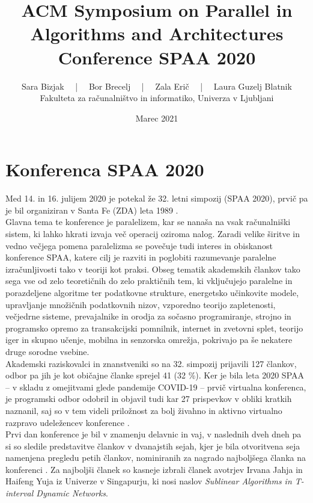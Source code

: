 \documentclass[a4paper,11pt]{article}
\title{
\textbf{ACM Symposium on Parallel in Algorithms and Architectures} 
\\
Conference SPAA 2020
}
\author{Sara Bizjak  \ \ |  \ \ Bor Brecelj  \ \ |  \ \  Zala Erič  \ \ |  \ \  Laura Guzelj Blatnik
\\
\small{Fakulteta za računalništvo in informatiko, Univerza v Ljubljani}}
\date{Marec 2021}
\begin{document}
\maketitle


\section{Konferenca SPAA 2020}

Med 14. in 16. julijem 2020 je potekal že 32. letni simpozij (SPAA 2020), prvič pa je bil organiziran v Santa Fe (ZDA) leta 1989 \cite{bib:opis}.
\\
Glavna tema te konference je paralelizem, kar se nanaša na vsak računalniški sistem, ki lahko hkrati izvaja več operacij oziroma nalog.
Zaradi velike širitve in vedno večjega pomena paralelizma se povečuje tudi interes in obiskanost konference SPAA, katere
cilj je razviti in poglobiti razumevanje paralelne izračunljivosti tako v teoriji kot praksi. 
Obseg tematik akademskih člankov tako sega vse od zelo teoretičnih do zelo praktičnih tem, 
ki vključujejo paralelne in porazdeljene algoritme ter podatkovne strukture, energetsko učinkovite modele, upravljanje množičnih podatkovnih nizov, vzporedno teorijo zapletenosti, 
večjedrne sisteme, prevajalnike in orodja za sočasno programiranje, strojno in programsko opremo za transakcijski pomnilnik, internet in zvetovni splet, teorijo iger in skupno učenje, mobilna in senzorska omrežja, pokrivajo pa še nekatere druge sorodne vsebine.
\\
Akademski raziskovalci in znanstveniki so na 32. simpozij prijavili 127 člankov, odbor pa jih je kot običajne članke sprejel 41 (32 \%).
Ker je bila leta 2020 SPAA -- v skladu z omejitvami glede pandemije COVID-19 -- prvič virtualna konferenca, je programski odbor odobril in objavil tudi kar 27 prispevkov v obliki kratkih naznanil,
saj so v tem videli priložnost za bolj živahno in aktivno virtualno razpravo udeležencev konference \cite{bib:opis}.
\\
Prvi dan konference je bil v znamenju delavnic in vaj, v naslednih dveh dneh pa si so sledile
predstavitve člankov v dvanajstih sejah, kjer je bila otvoritvena seja namenjena pregledu petih člankov, nominiranih za nagrado najboljšega članka na konferenci \cite{bib:urnik}. 
Za najboljši članek so kasneje izbrali članek avotrjev Irvana Jahja in Haifeng Yuja iz Univerze v Singapurju, ki nosi naslov \textit{Sublinear Algorithms in T-interval Dynamic Networks}.
\end{document}
